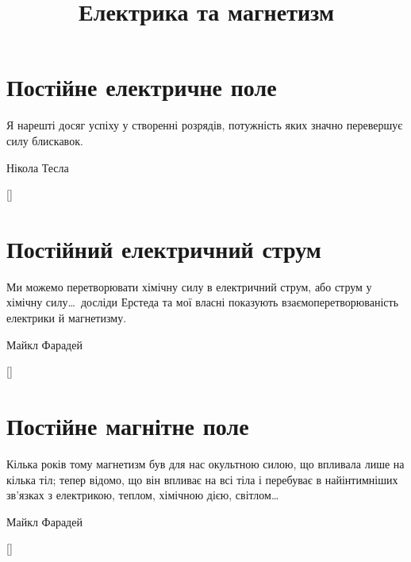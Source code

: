 \documentclass[biblatex]{ConspectBook}
\title{Електрика та магнетизм}
\begin{document}
\pagestyle{empty}
\CoverPage
\maketitle
\makeinfopage
%
\clearpage\pagestyle{plain}
\tableofcontents%
%

%
%

%
%
%


\clearpage
\pagestyle{main}

\part{Постійне електричне поле}
\label{part:SteadyElectricField}
\epigraph{Я нарешті досяг успіху у створенні розрядів, потужність яких значно перевершує силу блискавок.}{Нікола Тесла}
[]

\part{Постійний електричний струм}
\label{part:SteadyCurrent}
\epigraph{Ми можемо перетворювати хімічну силу в електричний струм, або струм у хімічну силу\ldots\ досліди Ерстеда та мої власні показують взаємоперетворюваність електрики й магнетизму.}{Майкл Фарадей}
[]

\part{Постійне магнітне поле}
\label{part:SteadyMagneticField}
\epigraph{Кілька років тому магнетизм був для нас окультною силою, що впливала лише на кілька тіл; тепер відомо, що він впливає на всі тіла і перебуває в найінтимніших зв'язках з електрикою, теплом, хімічною дією, світлом\ldots}{Майкл Фарадей}
[]
\end{document}
